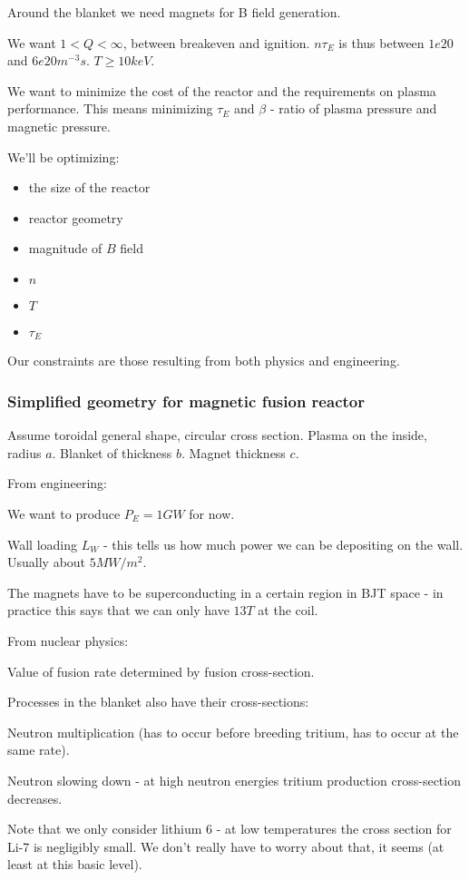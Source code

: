 \documentclass[PlasmaNotes.tex]{subfiles}
\begin{document}
Around the blanket we need magnets for B field generation.

We want $1<Q<\infty$, between breakeven and ignition. $n\tau_E$ is thus between $1e20$ and $6e20 m^{-3}s$. $T\geq 10keV$.

We want to minimize the cost of the reactor and the requirements on plasma performance. This means minimizing $\tau_E$ and $\beta$ - ratio of plasma pressure and magnetic pressure.

We'll be optimizing:
\begin{itemize}
 \item the size of the reactor
 \item reactor geometry
 \item magnitude of $B$ field
 \item $n$
 \item $T$
 \item $\tau_E$
\end{itemize}

Our constraints are those resulting from both physics and engineering.

\subsubsection{Simplified geometry for magnetic fusion reactor}

Assume toroidal general shape, circular cross section. Plasma on the inside, radius $a$. Blanket of thickness $b$. Magnet thickness $c$.

From engineering:

We want to produce $P_E=1GW$ for now.

Wall loading $L_W$ - this tells us how much power we can be depositing on the wall. Usually about $5 MW/m^2$.

The magnets have to be superconducting in a certain region in BJT space - in practice this says that we can only have $13 T$ at the coil.


From nuclear physics:

Value of fusion rate determined by fusion cross-section.

Processes in the blanket also have their cross-sections:

Neutron multiplication (has to occur before breeding tritium, has to occur at the same rate).

Neutron slowing down - at high neutron energies tritium production cross-section decreases.

Note that we only consider lithium 6 - at low temperatures the cross section for Li-7 is negligibly small. We don't really have to worry about that, it seems (at least at this basic level).
\end{document}

